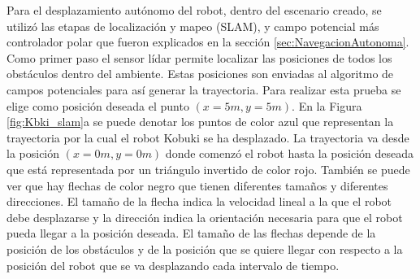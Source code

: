 Para el desplazamiento autónomo del robot, dentro del escenario creado, se utilizó las 
etapas de localización y mapeo (SLAM), y campo potencial más controlador polar que fueron 
explicados en la sección \ref{sec:NavegacionAutonoma}. Como primer paso el sensor lídar 
permite localizar las posiciones de todos los obstáculos dentro del ambiente. Estas 
posiciones son enviadas al algoritmo de campos potenciales para así generar la 
trayectoria. Para realizar esta prueba se elige como posición deseada el punto 
$(x = 5 m, y = 5 m)$. En la Figura \ref{fig:Kbki_slam}a se puede denotar los puntos de color 
azul que representan la trayectoria por la cual el robot Kobuki se ha desplazado. La 
trayectoria va desde la posición $(x = 0 m, y = 0 m)$ donde comenzó el robot hasta la posición
deseada que está representada por un triángulo invertido de color rojo. También se puede 
ver que hay flechas de color negro que tienen diferentes tamaños y diferentes direcciones.
El tamaño de la flecha indica la velocidad lineal a la que el robot debe desplazarse y 
la dirección indica la orientación necesaria para que el robot pueda llegar a la 
posición deseada. El tamaño de las flechas depende de la posición de los obstáculos y 
de la posición que se quiere llegar con respecto a la posición del robot que se va desplazando
cada intervalo de tiempo.


